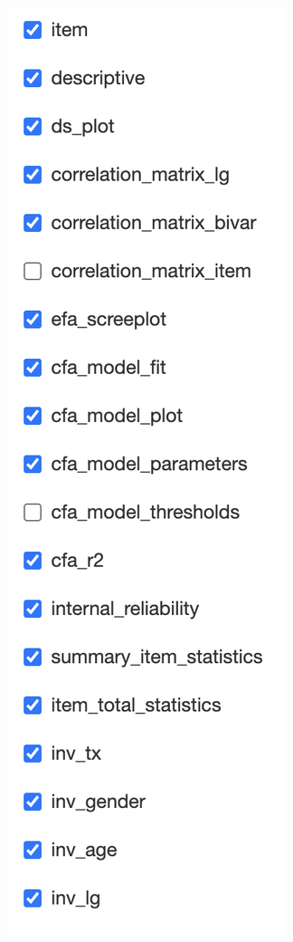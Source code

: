 \documentclass[
]{book}
\begin{document}
\begin{center}\includegraphics[width=0.66\linewidth]{images/render_report_manual2} \end{center}
\end{document}
